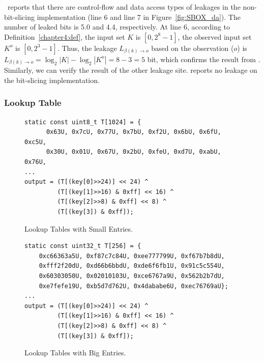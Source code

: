 \tool\ reports that there are control-flow and data access types of leakages
in the non-bit-slicing implementation (line 6 and line 7 in Figure~\ref{fig:SBOX_da}). The number of leaked bits is
5.0 and 4.4, respectively. At line 6, according to Definition~\ref{chapter4:def}, the
input set $K$ is $[0,2^8-1]$, the observed input set $K^o$ is $[0,2^3-1]$. Thus,
the leakage $L_{\beta(k)\rightarrow o}$ based on the observation ($o$) is
$L_{\beta(k)\rightarrow o} = \log_2{|K|} - \log_2{|K^o|} = 8-3 = 5$ bit, which
confirms the result from \tool. Similarly, we can verify the result of the other
leakage site. \tool{} reports no leakage on the bit-slicing implementation.


\subsubsection*{Lookup Table}
\begin{figure}
\centering
    \begin{lstlisting}[xleftmargin=.1\textwidth, xrightmargin=.1\textwidth, frame=none]
static const uint8_t T[1024] = {
      0x63U, 0x7cU, 0x77U, 0x7bU, 0xf2U, 0x6bU, 0x6fU, 0xc5U,
      0x30U, 0x01U, 0x67U, 0x2bU, 0xfeU, 0xd7U, 0xabU, 0x76U,
...
output = (T[(key[0]>>24)] << 24) ^
         (T[(key[1]>>16) & 0xff] << 16) ^
         (T[(key[2]>>8) & 0xff] << 8) ^
         (T[(key[3]) & 0xff]);
\end{lstlisting}
  \caption{Lookup Tables with Small Entries.}\label{fig:chapter4:small_lookup}
\end{figure}

\begin{figure}
\centering
    \begin{lstlisting}[xleftmargin=.1\textwidth, xrightmargin=.1\textwidth, frame=none]
static const uint32_t T[256] = {
    0xc66363a5U, 0xf87c7c84U, 0xee777799U, 0xf67b7b8dU,
    0xfff2f20dU, 0xd66b6bbdU, 0xde6f6fb1U, 0x91c5c554U,
    0x60303050U, 0x02010103U, 0xce6767a9U, 0x562b2b7dU,
    0xe7fefe19U, 0xb5d7d762U, 0x4dababe6U, 0xec76769aU};
...
output = (T[(key[0]>>24)] << 24) ^
         (T[(key[1]>>16) & 0xff] << 16) ^
         (T[(key[2]>>8) & 0xff] << 8) ^
         (T[(key[3]) & 0xff]);
\end{lstlisting}
  \caption{Lookup Tables with Big Entries.}\label{fig:chapter4:big_lookup}
\end{figure}


